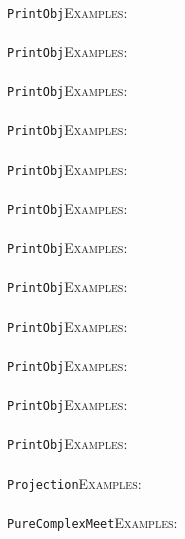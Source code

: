 \documentclass[a4paper,11pt]{report}
\begin{document}
{{ \\
 \texttt{PrintObj}{\nobreakspace}{\nobreakspace}{\nobreakspace}{\nobreakspace}\textsc{Examples:} \\
 \\
 \texttt{PrintObj}{\nobreakspace}{\nobreakspace}{\nobreakspace}{\nobreakspace}\textsc{Examples:} \\
 \\
 \texttt{PrintObj}{\nobreakspace}{\nobreakspace}{\nobreakspace}{\nobreakspace}\textsc{Examples:} \\
 \\
 \texttt{PrintObj}{\nobreakspace}{\nobreakspace}{\nobreakspace}{\nobreakspace}\textsc{Examples:} \\
 \\
 \texttt{PrintObj}{\nobreakspace}{\nobreakspace}{\nobreakspace}{\nobreakspace}\textsc{Examples:} \\
 \\
 \texttt{PrintObj}{\nobreakspace}{\nobreakspace}{\nobreakspace}{\nobreakspace}\textsc{Examples:} \\
 \\
 \texttt{PrintObj}{\nobreakspace}{\nobreakspace}{\nobreakspace}{\nobreakspace}\textsc{Examples:} \\
 \\
 \texttt{PrintObj}{\nobreakspace}{\nobreakspace}{\nobreakspace}{\nobreakspace}\textsc{Examples:} \\
 \\
 \texttt{PrintObj}{\nobreakspace}{\nobreakspace}{\nobreakspace}{\nobreakspace}\textsc{Examples:} \\
 \\
 \texttt{PrintObj}{\nobreakspace}{\nobreakspace}{\nobreakspace}{\nobreakspace}\textsc{Examples:} \\
 \\
 \texttt{PrintObj}{\nobreakspace}{\nobreakspace}{\nobreakspace}{\nobreakspace}\textsc{Examples:} \\
 \\
 \texttt{PrintObj}{\nobreakspace}{\nobreakspace}{\nobreakspace}{\nobreakspace}\textsc{Examples:} \\
 \\
 \texttt{Projection}{\nobreakspace}{\nobreakspace}{\nobreakspace}{\nobreakspace}\textsc{Examples:} \\
 \\
 \texttt{PureComplexMeet}{\nobreakspace}{\nobreakspace}{\nobreakspace}{\nobreakspace}\textsc{Examples:} \\
 \\
}}
\end{document}
